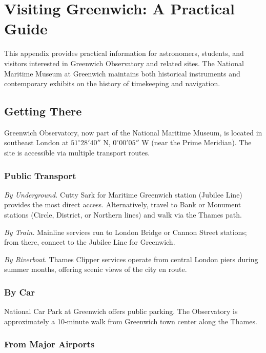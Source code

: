 \chapter{Visiting Greenwich: A Practical Guide}
\label{app:visiting-greenwich}

This appendix provides practical information for astronomers, students, and visitors interested in Greenwich Observatory and related sites. The National Maritime Museum at Greenwich maintains both historical instruments and contemporary exhibits on the history of timekeeping and navigation.

\section{Getting There}

Greenwich Observatory, now part of the National Maritime Museum, is located in southeast London at $51^{\circ}28'40''$ N, $0^{\circ}00'05''$ W (near the Prime Meridian). The site is accessible via multiple transport routes.

\subsection*{Public Transport}

\textit{By Underground.} Cutty Sark for Maritime Greenwich station (Jubilee Line) provides the most direct access. Alternatively, travel to Bank or Monument stations (Circle, District, or Northern lines) and walk via the Thames path.

\textit{By Train.} Mainline services run to London Bridge or Cannon Street stations; from there, connect to the Jubilee Line for Greenwich.

\textit{By Riverboat.} Thames Clipper services operate from central London piers during summer months, offering scenic views of the city en route.

\subsection*{By Car}

National Car Park at Greenwich offers public parking. The Observatory is approximately a 10-minute walk from Greenwich town center along the Thames.

\subsection*{From Major Airports}

